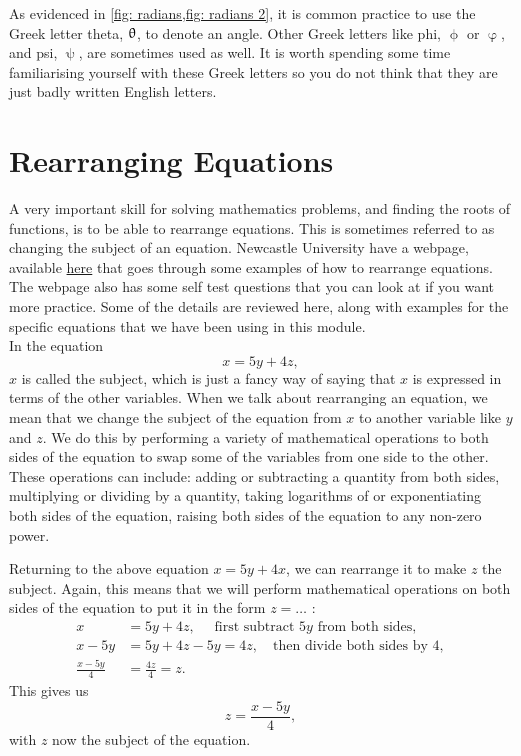 As evidenced in \cref{fig: radians,fig: radians 2}, it is common practice to use the Greek letter theta, $\uptheta$, to denote an angle. Other Greek letters like phi, $\upphi$ or $\upvarphi$, and psi, $\uppsi$, are sometimes used as well. It is worth spending some time familiarising yourself with these Greek letters so you do not think that they are just badly written English letters.

\section{Rearranging Equations}
\label{sec: rearranging}
A very important skill for solving mathematics problems, and finding the roots of functions, is to be able to rearrange equations. This is sometimes referred to as changing the subject of an equation. Newcastle University have a webpage, available \href{https://www.mas.ncl.ac.uk/ask/numeracy-maths-statistics/core-mathematics/pure-maths/algebra/rearranging-equations.html}{here} that goes through some examples of how to rearrange equations. The webpage also has some self test questions that you can look at if you want more practice. Some of the details are reviewed here, along with examples for the specific equations that we have been using in this module.\\


In the equation
\begin{equation*}
x=5y+4z,
\end{equation*}
$x$ is called the subject, which is just a fancy way of saying that $x$ is expressed in terms of the other variables. When we talk about rearranging an equation, we mean that we change the subject of the equation from $x$ to another variable like $y$ and $z$. We do this by performing a variety of mathematical operations to both sides of the equation to swap some of the variables from one side to the other. \\

These operations can include: adding or subtracting a quantity from both sides, multiplying or dividing by a quantity, taking logarithms of or exponentiating both sides of the equation, raising both sides of the equation to any non-zero power.\\
\begin{ex}
Returning to the above equation $x=5y+4x$, we can rearrange it to make $z$ the subject. Again, this means that we will perform mathematical operations on both sides of the equation to put it in the form $z=\dots{}$ : 
\begin{align*}
x&=5y+4z, \quad \text{ first subtract $5y$ from both sides},\\
x-5y&=5y+4z-5y=4z, \quad \text{then divide both sides by 4},\\
\frac{x-5y}{4}&=\frac{4z}{4}=z.
\end{align*}
This gives us
\begin{equation*}
z=\frac{x-5y}{4},
\end{equation*}
with $z$ now the subject of the equation.
\end{ex}

